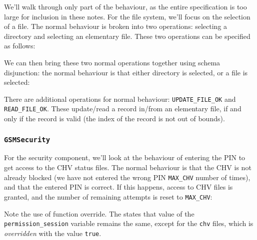 We'll walk through only part of the behaviour, as the entire specification is too large for inclusion in these notes. For the file system, we'll focus on the selection of a file. The normal behaviour is broken into two operations: selecting a directory and selecting an elementary file. These two operations can be specified as follows:





We can then bring these two normal operations together using schema disjunction: the normal behaviour is that either directory is selected, or a file is selected:



There are additional operations for normal behaviour: \texttt{UPDATE\_FILE\_OK} and \texttt{READ\_FILE\_OK}. These update/read a record in/from an elementary file, if and only if the record is valid (the index of the record is not out of bounds).

\subsubsection*{\texttt{GSMSecurity}}

For the security component, we'll look at the behaviour of entering the PIN to get access to the CHV status files. The normal behaviour is that the CHV is not already blocked (we have not entered the wrong PIN \texttt{MAX\_CHV} number of times), and that the entered PIN is correct. If this happens, access to CHV files is granted, and the number of remaining attempts is reset to \texttt{MAX\_CHV}:



Note the use of function override. The states that value of the  \texttt{permission\_session} variable remains the same, except for the \texttt{chv} files, which is \emph{overridden} with the value \texttt{true}.

